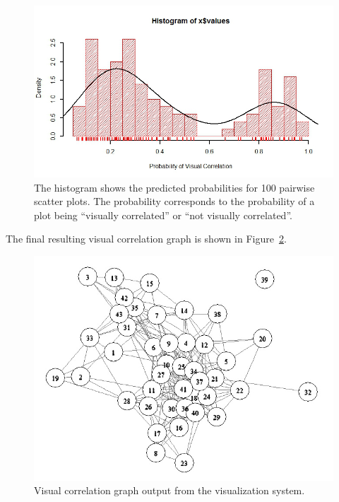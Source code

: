 \begin{figure}[htb]
	\begin{center}
		\includegraphics[width=1\linewidth]
		{ch-usage/figures/predicted_probability_histogram}
		\caption[Histogram of predicted probabilities.]{The histogram shows the 
		predicted probabilities for 100 pairwise scatter plots. The 
		probability corresponds to the probability of a plot being 
		``visually correlated'' or ``not visually correlated''.}
		\label{fig:usage:hist}
	\end{center}
\end{figure}

\newpage
The final resulting visual correlation graph is shown in 
Figure~\ref{fig:usage:visg}. 

\begin{figure}[H]
	\begin{center}
		\includegraphics[width=0.75\linewidth]
		{ch-usage/figures/visgraph}
		\caption[Visual correlation graph output from the visualization 
		system.]{Visual correlation
		graph output from the visualization system.}
		\label{fig:usage:visg}
	\end{center}
\end{figure}

